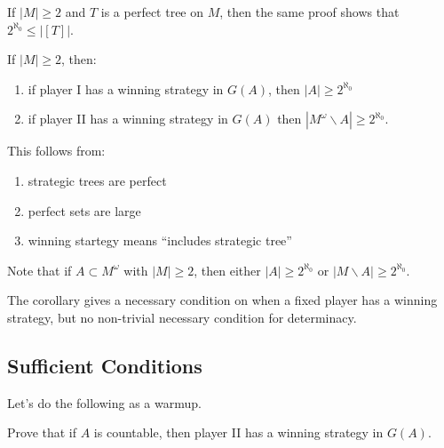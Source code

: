 \documentclass[]{article}
\newcommand{\om}{\omega}
\begin{document}
\begin{remark}
    If $|M|\ge 2$ and $T$ is a perfect tree on $M$, then the same proof shows that $2^{\aleph_0}\le |[T]|$.
\end{remark}

\begin{remark}[Corollary]
    If $|M|\ge 2$, then:
    \begin{enumerate}[label = (\roman*)]
        \item if player I has a winning strategy in $G(A)$, then $|A|\ge 2^{\aleph_0}$
        \item if player II has a winning strategy in $G(A)$ then $|M^\om \backslash A| \ge 2^{\aleph_0}$.
    \end{enumerate}
    This follows from:
    \begin{enumerate}
        \item strategic trees are perfect
        \item perfect sets are large
        \item winning startegy means ``includes strategic tree''
    \end{enumerate}
\end{remark}

Note that if $A\subset M^\om$ with $|M|\ge 2$, then either $|A|\ge 2^{\aleph_0}$ or $|M\backslash A| \ge 2^{\aleph_0}$.

The corollary gives a necessary condition on when a fixed player has a winning strategy, but no non-trivial necessary condition for determinacy.

\subsection*{Sufficient Conditions}

Let's do the following as a warmup.

Prove that if $A$ is countable, then player II has a winning strategy in $G(A)$.
\end{document}
